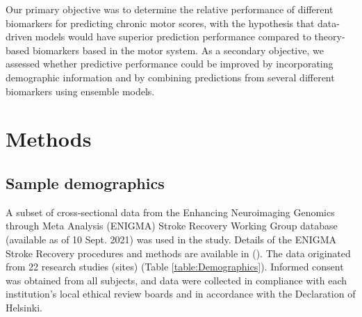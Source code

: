 \documentclass[phd,tocprelim]{cornell}
\begin{document}
Our primary objective was to determine the relative performance of different biomarkers for predicting chronic motor scores, with the hypothesis that data-driven models would have superior prediction performance compared to theory-based biomarkers based in the motor system. As a secondary objective, we assessed whether predictive performance could be improved by incorporating demographic information and by combining predictions from several different biomarkers using ensemble models.

\section{Methods}

\subsection{Sample demographics}
A subset of cross‐sectional data from the Enhancing Neuroimaging Genomics through Meta Analysis (ENIGMA) Stroke Recovery Working Group database (available as of 10 Sept. 2021) was used in the study. Details of the ENIGMA Stroke Recovery procedures and methods are available in (\cite{Liew2020-ps}). The data originated from 22 research studies (sites) (Table \ref{table:Demographics}). Informed consent was obtained from all subjects, and data were collected in compliance with each institution’s local ethical review boards and in accordance with the Declaration of Helsinki.
\end{document}

